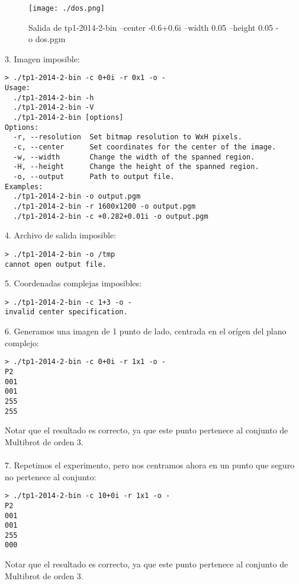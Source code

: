 \documentclass[a4paper,10pt]{article}
\begin{document}
\begin{figure}
\begin{center}
\texttt{[image: ./dos.png]}
\label{fig:Region comprendida entre -0.625+0.625i y -0.575+0.575i.}
\caption{Salida de tp1-2014-2-bin --center -0.6+0.6i --width 0.05 --height 0.05 -o dos.pgm}
\end{center}
\end{figure}

3. Imagen imposible:
\begin{verbatim}
> ./tp1-2014-2-bin -c 0+0i -r 0x1 -o -
Usage:
  ./tp1-2014-2-bin -h
  ./tp1-2014-2-bin -V
  ./tp1-2014-2-bin [options]
Options:
  -r, --resolution  Set bitmap resolution to WxH pixels.
  -c, --center      Set coordinates for the center of the image.
  -w, --width       Change the width of the spanned region.
  -H, --height      Change the height of the spanned region.
  -o, --output      Path to output file.
Examples:
  ./tp1-2014-2-bin -o output.pgm
  ./tp1-2014-2-bin -r 1600x1200 -o output.pgm
  ./tp1-2014-2-bin -c +0.282+0.01i -o output.pgm
\end{verbatim}

4. Archivo de salida imposible:
\begin{verbatim}
> ./tp1-2014-2-bin -o /tmp
cannot open output file.
\end{verbatim}

5. Coordenadas complejas imposibles:
\begin{verbatim}
> ./tp1-2014-2-bin -c 1+3 -o -
invalid center specification.
\end{verbatim}

6. Generamos una imagen de 1 punto de lado, centrada en el or\'igen del plano complejo:
\begin{verbatim}
> ./tp1-2014-2-bin -c 0+0i -r 1x1 -o -
P2
001
001
255
255
\end{verbatim}

Notar que el resultado es correcto, ya que este punto pertenece al conjunto de Multibrot de orden 3.\\
\\

7. Repetimos el experimento, pero nos centramos ahora en un punto que seguro no pertenece
al conjunto:
\begin{verbatim}
> ./tp1-2014-2-bin -c 10+0i -r 1x1 -o -
P2
001
001
255
000
\end{verbatim}

Notar que el resultado es correcto, ya que este punto pertenece al conjunto de Multibrot de orden 3.
\\
\end{document}
